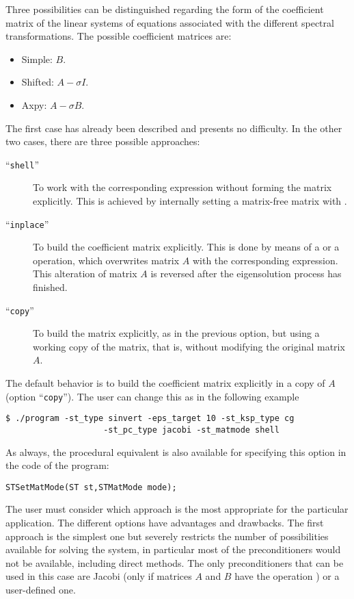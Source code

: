 	Three possibilities can be distinguished regarding the form of the coefficient matrix of the linear systems of equations associated with the different spectral transformations. The possible coefficient matrices are:
	\begin{itemize}
	\item Simple: $B$.
	\item Shifted: $A-\sigma I$.
	\item Axpy: $A-\sigma B$.
	\end{itemize}
	The first case has already been described and presents no difficulty. In the other two cases, there are three possible approaches:
	\begin{description}
	\item[``\Verb!shell!''] To work with the corresponding expression without forming the matrix explicitly. This is achieved by internally setting a matrix-free matrix with .
	\item[``\Verb!inplace!''] To build the coefficient matrix explicitly. This is done by means of a  or a  operation, which overwrites matrix $A$ with the corresponding expression. This alteration of matrix $A$ is reversed after the eigensolution process has finished.
	\item[``\Verb!copy!''] To build the matrix explicitly, as in the previous option, but using a working copy of the matrix, that is, without modifying the original matrix $A$. 
	\end{description}
	The default behavior is to build the coefficient matrix explicitly in a copy of $A$ (option ``\Verb!copy!''). The user can change this as in the following example
\begin{Verbatim}[fontsize=\small]
	$ ./program -st_type sinvert -eps_target 10 -st_ksp_type cg
                    -st_pc_type jacobi -st_matmode shell
\end{Verbatim}
	As always, the procedural equivalent is also available for specifying this option in the code of the program:
	\begin{Verbatim}[fontsize=\small]
	STSetMatMode(ST st,STMatMode mode);
	\end{Verbatim}

	The user must consider which approach is the most appropriate for the particular application. The different options have advantages and drawbacks. The first approach is the simplest one but severely restricts the number of possibilities available for solving the system, in particular most of the \petsc{} preconditioners would not be available, including direct methods. The only preconditioners that can be used in this case are Jacobi (only if matrices $A$ and $B$ have the operation ) or a user-defined one.
	
